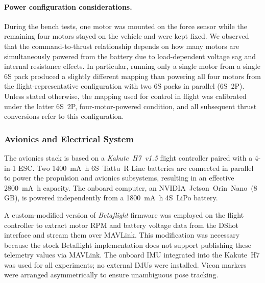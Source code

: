\paragraph{Power configuration considerations.}
During the bench tests, one motor was mounted on the force sensor while the remaining four motors stayed on the vehicle and were kept fixed. We observed that the command-to-thrust relationship depends on how many motors are simultaneously powered from the battery due to load-dependent voltage sag and internal resistance effects. In particular, running only a single motor from a single 6S pack produced a slightly different mapping than powering all four motors from the flight-representative configuration with two 6S packs in parallel (6S~2P). Unless stated otherwise, the mapping used for control in flight was calibrated under the latter 6S~2P, four-motor-powered condition, and all subsequent thrust conversions refer to this configuration.

\subsubsection{Avionics and Electrical System}
The avionics stack is based on a \textit{Kakute~H7~v1.5} flight controller paired with a 4-in-1 ESC. Two \SI{1400}{\milli\ampere\hour} 6S~Tattu~R-Line batteries are connected in parallel to power the propulsion and avionics subsystems, resulting in an effective \SI{2800}{\milli\ampere\hour} capacity. The onboard computer, an NVIDIA~Jetson~Orin~Nano~(8\,GB), is powered independently from a \SI{1800}{\milli\ampere\hour} 4S~LiPo battery.

A custom-modified version of \textit{Betaflight} firmware was employed on the flight controller to extract motor RPM and battery voltage data from the DShot interface and stream them over MAVLink. This modification was necessary because the stock Betaflight implementation does not support publishing these telemetry values via MAVLink. The onboard IMU integrated into the Kakute~H7 was used for all experiments; no external IMUs were installed. Vicon markers were arranged asymmetrically to ensure unambiguous pose tracking.

